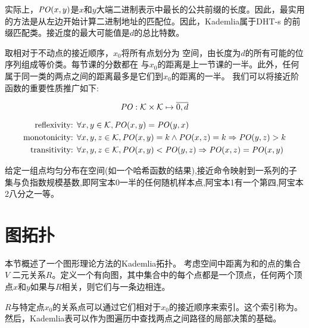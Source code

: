 实际上，$\mathit{PO}(x,y)$是$x$和$y$大端二进制表示中最长的公共前缀的长度。因此，最实用的方法是从左边开始计算二进制地址的匹配位。因此，Kademlia属于DHT-s \cite{rowstron2001pastry,zhao2004tapestry}的前缀匹配类。接近度的最大可能值是$d$的总比特数。 

取相对于不动点的接近顺序，$x_0$将所有点划分为
空间，由长度为$d$的所有可能的位序列组成等价类。每节课的分数都在
与$x_0$的距离是上一节课的一半。此外，任何属于同一类的两点之间的距离最多是它们到$x_0$的距离的一半。 
我们可以将接近阶函数的重要性质推广如下:

\begin{definition}\label{def:PO}
\begin{equation}
\mathit{PO}: \mathcal{K}\times \mathcal{K}\mapsto \overline{0,d}
\end{equation}

\begin{subequations}
  \begin{align}
    \label{eq:PO-constraint-symmetry} \text{reflexivity:  }&\forall x,y\in \mathcal{K}, \mathit{PO}(x,y)=\mathit{PO}(y,x)\\
    \label{eq:PO-constraint-monotonicity}\text{monotonicity:   }&\forall x,y,z\in \mathcal{K}, \mathit{PO}(x,y)=k \land  \mathit{PO}(x,z)=k \Rightarrow  \mathit{PO}(y,z)>k\\
\label{eq:PO-constraint-transitivity}\text{transitivity:   }&\forall x,y,z\in \mathcal{K}, \mathit{PO}(x,y)<\mathit{PO}(y,z) \Rightarrow \mathit{PO}(x,z)=\mathit{PO}(x,y)
   \end{align}
\end{subequations}
\end{definition}

给定一组点均匀分布在空间(如一个哈希函数的结果),接近命令映射到一系列的子集与负指数规模基数,即阿宝本$0$一半的任何随机样本点,阿宝本1有一个第四,阿宝本2八分之一等。

\section{图拓扑}

本节概述了一个图形理论方法的Kademlia拓扑\cite{aspnes2007skip}。
考虑空间中距离为和的点的集合$V$ 
二元关系$R$。定义一个有向图，其中集合中的每个点都是一个顶点，任何两个顶点$x$和$y$如果与$R$相关，则它们与一条边相连。 


$R$与特定点$x_0$的关系点可以通过它们相对于$x_0$的接近顺序来索引。这个索引称为。
然后，Kademlia表可以作为图遍历中查找两点之间路径的局部决策的基础。 


